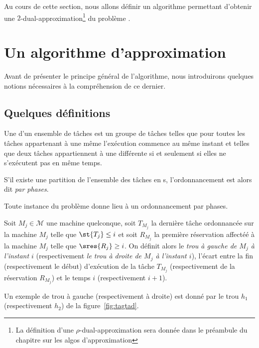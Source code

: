 \documentclass[a4paper,9pt]{article}
\begin{document}
Au cours de cette section, nous allons définir un algorithme permettant d'obtenir une
$2$-dual-approximation\footnote{La définition d'une $\rho$-dual-approximation sera donnée dans le
préambule du chapitre sur les algos d'approximation} du problème \unitfisched{}. 

\section{Un algorithme d'approximation}

Avant de présenter le principe général de l'algorithme, nous introduirons quelques notions
nécessaires à la compréhension de ce dernier.

\subsection{Quelques définitions}

\begin{ndf}[Phases]
    Une \tphase{} d'un ensemble de tâches est un groupe de tâches telles que pour toutes les tâches
    appartenant à une même \tphase{} l'exécution commence au même instant et telles que deux tâches
    appartiennent à une \tphase{} différente si et seulement si elles ne s'exécutent pas en même
    temps.

    S'il existe une partition de l'ensemble des tâches en \tphase{}s, l'ordonnancement est alors dit
    \emph{par phases}.
\end{ndf}

\begin{nprop}
    Toute instance du problème \unitfisched{} donne lieu à un ordonnancement par phases.
\end{nprop}


\begin{ndf}
    Soit $M_j \in \mathcal{M}$ une machine quelconque, soit $T_{M_j}$ la dernière tâche ordonnancée
    sur la machine $M_j$ telle que $\st{T_j} \leq i$ et soit $R_{M_j}$ la première réservation
    affectéé à la machine $M_j$ telle que $\sres{R_j} \geq i$. On définit alors le \emph{trou à gauche
    de $M_j$ à l'instant $i$} (respectivement \emph{le trou à droite de $M_j$ à l'instant $i$}), l'écart
    entre la fin (respectivement le début) d'exécution de la tâche $T_{M_j}$ (respectivement de la
    réservation $R_{M_j}$) et le temps $i$ (respectivement $i+1$).

    Un exemple de trou à gauche (respectivement à droite) est donné par le trou $h_1$
    (respectivement $h_2$) de la figure~\ref{fig:tagtad}.
\end{ndf}
\end{document}
